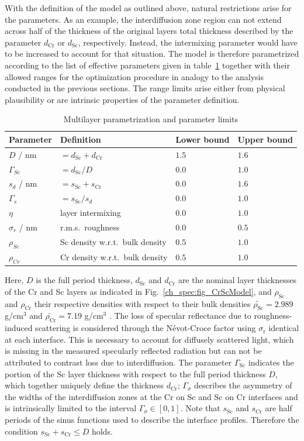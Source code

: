 With the definition of the model as outlined above, natural restrictions arise for the parameters. As an example, the interdiffusion zone region can not extend across half of the thickness of the original layers total thickness described by the parameter $d_\text{Cr}$ or $d_\text{Sc}$, respectively. Instead, the intermixing parameter would have to be increased to account for that situation. The model is therefore parametrized according to the list of effective parameters given in table~\ref{ch_spec:tbl_CrSc_gradual_parametrization} together with their allowed ranges for the optimization procedure in analogy to the analysis conducted in the previous sections. The range limits arise either from physical plausibility or are intrinsic properties of the parameter definition.
\begin{table}[htbp]
\centering
\caption{Multilayer parametrization and parameter limits}
\label{ch_spec:tbl_CrSc_gradual_parametrization}
\begin{tabular}{@{}llll@{}}
\toprule
Parameter & Definition & Lower bound & Upper bound\\ \midrule
$D$ / nm & $= d_\text{Sc} + d_\text{Cr}$ & $1.5$&$1.6$ \\ 
$\Gamma_{Sc}$ & $= d_\text{Sc} / D$&$0.0$ &$1.0$ \\ 
$s_d$ / nm&$=s_\text{Sc} + s_\text{Cr}$&$0.0$ & $1.6$\\ 
$\Gamma_s$ &$= s_\text{Sc} / s_d$& $0.0$& $1.0$\\ 
$\eta$ &layer intermixing&$0.0$& $1.0$\\ 
$\sigma_r$ / nm & r.m.s.~roughness& $0.0$& $0.5$\\ 
$\rho_{Sc}$ &Sc density w.r.t.~bulk density & $0.5$& $1.0$\\ 
$\rho_{Cr}$ &Cr density w.r.t.~bulk density& $0.5$& $1.0$\\ 
 \bottomrule
\end{tabular}
\end{table}
Here, $D$ is the full period thickness, $d_\text{Sc}$ and $d_\text{Cr}$ are the 
nominal layer thicknesses of the Cr and Sc layers as indicated in 
Fig.~\ref{ch_spec:fig_CrScModel}, and $\rho_\text{Sc}$ and $\rho_\text{Cr}$ their 
respective densities with respect to their bulk densities 
$\tilde{\rho_\text{Sc}} = 2.989$ g/cm$^3$ and $\tilde{\rho_\text{Cr}} = 7.19$ 
g/cm$^3$ \cite{henke_x-ray_1993}. The loss of specular 
reflectance due to roughness-induced scattering is considered through the 
N\'{e}vot-Croce factor using $\sigma_\text{r}$ identical at each interface. This is necessary to account for diffusely scattered light, which is missing in the measured specularly reflected radiation but can not be attributed to contrast loss due to interdiffusion. The parameter $\Gamma_\text{Sc}$ indicates the portion of the Sc layer thickness 
with respect to the full period thickness $D$, which together uniquely define the thickness $d_\text{Cr}$; $\Gamma_\sigma$ describes the 
asymmetry of the widths of the interdiffusion zones at the Cr on Sc and Sc on Cr 
interfaces and is intrinsically limited to the interval $\Gamma_\sigma \in [0,1]$. Note that 
$s_\text{Sc}$ and $s_\text{Cr}$ are half periods of the sinus functions used to 
describe the interface profiles. Therefore the condition $s_\text{Sc} + 
s_\text{Cr} \leq D$ holds.

